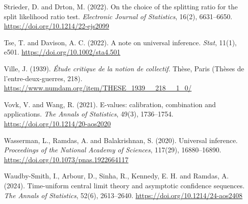 \documentclass[
  10pt,
  a4paper,
]{article}
\begin{document}
Strieder, D. and Drton, M. (2022). On the choice of the splitting ratio
for the split likelihood ratio test. \emph{Electronic Journal of
Statistics}, 16(2), 6631--6650. \url{https://doi.org/10.1214/22-ejs2099}

Tse, T. and Davison, A. C. (2022). A note on universal inference.
\emph{Stat}, 11(1), e501. \url{https://doi.org/10.1002/sta4.501}

Ville, J. (1939). \emph{Étude critique de la notion de collectif}.
Thèse, Paris (Thèses de l'entre-deux-guerres, 218).
\url{https://www.numdam.org/item/THESE_1939__218__1_0/}

Vovk, V. and Wang, R. (2021). E-values: calibration, combination and
applications. \emph{The Annals of Statistics}, 49(3), 1736--1754.
\url{https://doi.org/10.1214/20-aos2020}

Wasserman, L., Ramdas, A. and Balakrishnan, S. (2020). Universal
inference. \emph{Proceedings of the National Academy of Sciences},
117(29), 16880--16890. \url{https://doi.org/10.1073/pnas.1922664117}

Waudby-Smith, I., Arbour, D., Sinha, R., Kennedy, E. H. and Ramdas, A.
(2024). Time-uniform central limit theory and asymptotic confidence
sequences. \emph{The Annals of Statistics}, 52(6), 2613--2640.
\url{https://doi.org/10.1214/24-aos2408}
\end{document}
